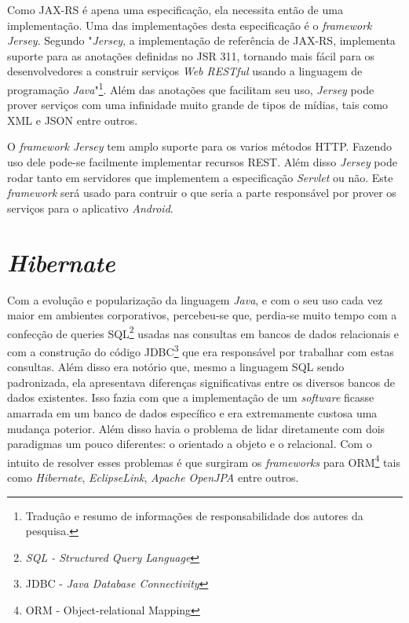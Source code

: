	\par Como JAX-RS é apena uma especificação, ela necessita então de uma
implementação. Uma das implementações desta especificação é o
\textit{framework Jersey}. Segundo  "\textit{Jersey}, a
implementação de referência de JAX-RS, implementa suporte para as anotações
definidas no JSR 311, tornando mais fácil para os desenvolvedores a construir
serviços \textit{Web RESTful} usando a linguagem de programação
\textit{Java}"\footnote{Tradução e resumo de informações de responsabilidade
dos autores da pesquisa.}. Além das anotações que facilitam seu uso,
\textit{Jersey} pode prover serviços com uma infinidade muito grande de tipos de
mídias, tais como XML e JSON entre outros.

	\par O \textit{framework Jersey} tem amplo suporte para os varios métodos HTTP.
Fazendo uso dele pode-se facilmente implementar recursos REST. Além disso
\textit{Jersey}  pode rodar tanto em servidores que implementem a especificação
\textit{Servlet} ou não. Este \textit{framework} será usado para contruir o que
seria a parte responsável por prover os serviços para o aplicativo
\textit{Android}.

\section{\textit{Hibernate}}

	\par Com a evolução e popularização da linguagem \textit{Java}, e com o seu
uso cada vez maior em ambientes corporativos, percebeu-se que, perdia-se muito
tempo com a confecção de queries SQL\footnote{\textit{SQL - Structured Query
Language}} usadas nas consultas em bancos de dados relacionais e com a
construção do código JDBC\footnote{JDBC - \textit{Java Database Connectivity}}
que era responsável por trabalhar com estas consultas. Além disso era notório
que, mesmo a linguagem SQL sendo padronizada, ela apresentava diferenças
significativas entre os diversos bancos de dados existentes. Isso fazia com que
a implementação de um \textit{software} ficasse amarrada em um banco de dados
específico e era extremamente custosa uma mudança poterior. Além disso havia o
problema de lidar diretamente com dois paradigmas um pouco diferentes: o
orientado a objeto e o relacional. Com o intuito de resolver esses problemas é
que surgiram os \textit{frameworks} para ORM\footnote{ORM - Object-relational
Mapping} tais como \textit{Hibernate}, \textit{EclipseLink}, \textit{Apache
OpenJPA} entre outros.

